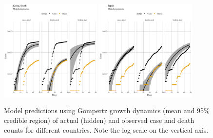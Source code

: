 \documentclass[a4paper]{tufte-handout}
\begin{document}
\begin{figure}
\begin{center}
    \includegraphics[width=0.45\textwidth]{../figs/model_pred_Gomp_KOR.pdf}
    \includegraphics[width=0.45\textwidth]{../figs/model_pred_Gomp_JPN.pdf}
  \end{center}
  \caption{\label{fig:modelpredGomp} Model predictions using Gompertz
    growth dynamics (mean and 95\% credible region) of actual (hidden)
    and observed case and death counts for different countries. Note
    the log scale on the vertical axis.}
\end{figure}

\end{document}

